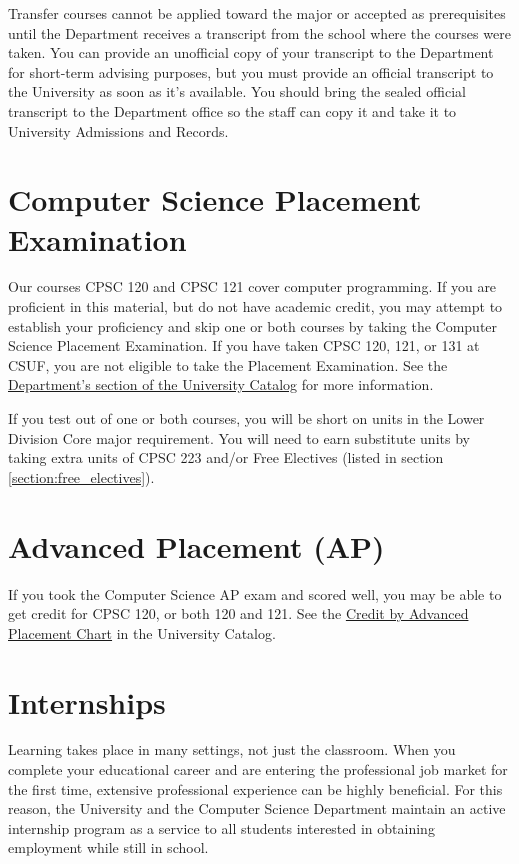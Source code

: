 \documentclass{book}
\newcommand{\campusname}{CSUF}
\begin{document}
Transfer courses cannot be applied toward the major or accepted as prerequisites until the Department receives a transcript from the school where the courses were taken. You can provide an unofficial copy of your transcript to the Department for short-term advising purposes, but you must provide an official transcript to the University as soon as it’s available. You should bring the sealed official transcript to the Department office so the staff can copy it and take it to University Admissions and Records.

\section{Computer Science Placement Examination}
\label{section:placement}
Our courses CPSC 120 and CPSC 121 cover computer programming. If you are proficient in this material, but do not have academic credit, you may attempt to establish your proficiency and skip one or both courses by taking the Computer Science Placement Examination. If you have taken CPSC 120, 121, or 131 at \campusname, you are not eligible to take the Placement Examination. See the \href{http://catalog.fullerton.edu/preview_program.php?catoid=2&poid=537&returnto=137}{Department's section of the University Catalog} for more information.

If you test out of one or both courses, you will be short on units in the Lower Division Core major requirement. You will need to earn substitute units by taking extra units of CPSC 223 and/or Free Electives (listed in section \ref{section:free_electives}).

\section{Advanced Placement (AP)}
\label{section:ap}
If you took the Computer Science AP exam and scored well, you may be able to get credit for CPSC 120, or both 120 and 121. See the \href{http://catalog.fullerton.edu/content.php?catoid=2&navoid=153#Credit%20by%20Advanced%20Placement%20Chart}{Credit by Advanced Placement Chart} in the University Catalog.

\section{Internships}

Learning takes place in many settings, not just the classroom. When you complete your educational career and are entering the professional job market for the first time, extensive professional experience can be highly beneficial. For this reason, the University and the Computer Science Department maintain an active internship program as a service to all students interested in obtaining employment while still in school.
\end{document}
